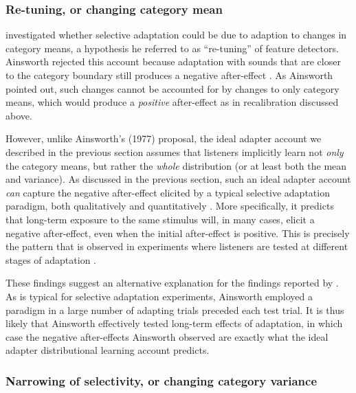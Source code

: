 \subsubsection{Re-tuning, or changing category mean}
\label{sec:re-tuning-or}

\textcite{Ainsworth1977} investigated whether selective adaptation could be due to adaption to changes in category means, a hypothesis he referred to as ``re-tuning'' of feature detectors.  Ainsworth rejected this account because adaptation with sounds that are closer to the category boundary still produces a negative after-effect \autocite{Ainsworth1977}.  As Ainsworth pointed out, such changes cannot be accounted for by changes to only category means, which would produce a \emph{positive} after-effect as in recalibration discussed above.  

\label{r2-whole-distribution-2}
However, unlike Ainsworth's (1977) proposal, the ideal adapter account we described in the previous section assumes that listeners implicitly learn not \emph{only} the category means, but rather the {\em whole} distribution (or at least both the mean and variance). As discussed in the previous section, such an ideal adapter account {\em can} capture the negative after-effect elicited by a typical selective adaptation paradigm, both qualitatively and quantitatively \autocite{Kleinschmidt2015}. More specifically, it predicts that long-term exposure to the same stimulus will, in many cases, elicit a negative after-effect, even when the initial after-effect is positive.  This is precisely the pattern that is observed in experiments where listeners are tested at different stages of adaptation \autocites{Kleinschmidt2015}[see also][]{Vroomen2007}[and the re-analysis of][therein]{Samuel2001}.

These findings suggest an alternative explanation for the findings reported by \textcite{Ainsworth1977}. As is typical for selective adaptation experiments, Ainsworth employed a paradigm in a large number of adapting trials preceded each test trial. It is thus likely that Ainsworth effectively tested long-term effects of adaptation, in which case the negative after-effects Ainsworth observed are exactly what the ideal adapter distributional learning account predicts.

\subsubsection{Narrowing of selectivity, or changing category variance}
\label{sec:narr-select-or}

